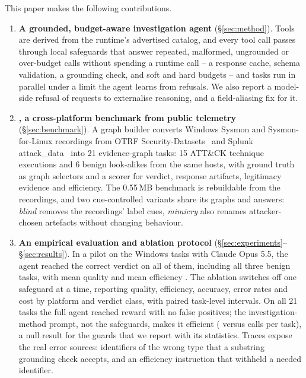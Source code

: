 This paper makes the following contributions.

\begin{enumerate}
\item \textbf{A grounded, budget-aware investigation agent} (\S\ref{sec:method}). Tools are derived from the
runtime's advertised catalog, and every tool call passes through local safeguards that answer repeated,
malformed, ungrounded or over-budget calls without spending a runtime call
-- a response cache, schema validation, a grounding check, and soft and hard budgets -- and tasks run in parallel
under a limit the agent learns from refusals. We also report a model-side refusal of requests to externalise
reasoning, and a field-aliasing fix for it.
\item \textbf{\bench, a cross-platform benchmark from public telemetry} (\S\ref{sec:benchmark}). A graph builder
converts Windows Sysmon and Sysmon-for-Linux recordings from OTRF Security-Datasets~\cite{otrf_securitydatasets}
and Splunk attack\_data~\cite{splunk_attackdata} into 21 evidence-graph tasks: 15 ATT\&CK technique executions
and 6 benign look-alikes from the same hosts, with ground truth as graph selectors and a scorer for verdict,
response artifacts, legitimacy evidence and efficiency. The 0.55\,MB benchmark is rebuildable from the
recordings, and two cue-controlled variants share its graphs and answers: \emph{blind} removes the recordings'
label cues, \emph{mimicry} also renames attacker-chosen artefacts without changing behaviour.
\item \textbf{An empirical evaluation and ablation protocol} (\S\ref{sec:experiments}--\S\ref{sec:results}).
\ifconf\else In a pilot on the \ResPilotTasks{} Windows tasks with Claude Opus 5.5, the agent reached the correct
verdict on all of them, including all three benign tasks, with mean quality \ResPilotQuality{} and mean
efficiency \ResPilotEfficiency{}. \fi The ablation switches off one safeguard at a time, reporting quality,
efficiency, accuracy, error rates and cost by platform and verdict class, with paired task-level intervals.
\ifnum{}
On all 21 tasks the full agent reached reward \ResFullReward{} with no false positives; the investigation-method
prompt, not the safeguards, makes it efficient (\ResNoMethodCalls{} versus \ResFullCalls{} calls per task), a null
result for the guards that we report with its statistics. Traces expose the real error sources: identifiers of
the wrong type that a substring grounding check accepts, and an efficiency instruction that withheld a needed
identifier.

\end{enumerate}
